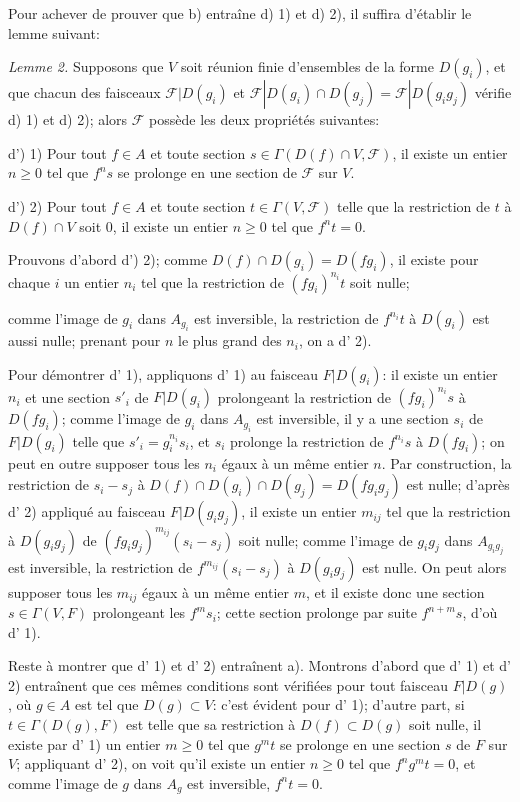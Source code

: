 Pour achever de prouver que b) entraîne d) 1) et d) 2), il suffira d'établir le lemme suivant:

\emph{Lemme 2.} Supposons que $V$ soit réunion finie d'ensembles de la forme $D(g_i)$, et que chacun des faisceaux $\mathcal{F}|D(g_i)$ et $\mathcal{F}|D(g_i) \cap D(g_j) = \mathcal{F}|D(g_i g_j)$ vérifie d) 1) et d) 2); alors $\mathcal{F}$ possède les deux propriétés suivantes:

d') 1) Pour tout $f \in A$ et toute section $s \in \Gamma(D(f) \cap V, \mathcal{F})$, il existe un entier $n \ge 0$ tel que $f^n s$ se prolonge en une section de $\mathcal{F}$ sur $V$.

d') 2) Pour tout $f \in A$ et toute section $t \in \Gamma(V, \mathcal{F})$ telle que la restriction de $t$ à $D(f) \cap V$ soit 0, il existe un entier $n \ge 0$ tel que $f^n t = 0$.

Prouvons d'abord d') 2); comme $D(f) \cap D(g_i) = D(fg_i)$, il existe pour chaque $i$ un entier $n_i$ tel que la restriction de $(fg_i)^{n_i} t$ soit nulle;

\newpage


comme l'image de $g_i$ dans $A_{g_i}$ est inversible, la restriction de $f^{n_i}t$ à $D(g_i)$ est aussi nulle; prenant pour $n$ le plus grand des $n_i$, on a d' 2).

Pour démontrer d' 1), appliquons d' 1) au faisceau $F|D(g_i)$: il existe un entier $n_i$ et une section $s'_i$ de $F|D(g_i)$ prolongeant la restriction de $(fg_i)^{n_i}s$ à $D(fg_i)$; comme l'image de $g_i$ dans $A_{g_i}$ est inversible, il y a une section $s_i$ de $F|D(g_i)$ telle que $s'_i = g_i^{n_i}s_i$, et $s_i$ prolonge la restriction de $f^{n_i}s$ à $D(fg_i)$; on peut en outre supposer tous les $n_i$ égaux à un même entier $n$. Par construction, la restriction de $s_i - s_j$ à $D(f) \cap D(g_i) \cap D(g_j) = D(fg_ig_j)$ est nulle; d'après d' 2) appliqué au faisceau $F|D(g_ig_j)$, il existe un entier $m_{ij}$ tel que la restriction à $D(g_ig_j)$ de $(fg_ig_j)^{m_{ij}}(s_i - s_j)$ soit nulle; comme l'image de $g_ig_j$ dans $A_{g_ig_j}$ est inversible, la restriction de $f^{m_{ij}}(s_i - s_j)$ à $D(g_ig_j)$ est nulle. On peut alors supposer tous les $m_{ij}$ égaux à un même entier $m$, et il existe donc une section $s \in \Gamma(V,F)$ prolongeant les $f^m s_i$; cette section prolonge par suite $f^{n+m}s$, d'où d' 1).

Reste à montrer que d' 1) et d' 2) entraînent a). Montrons d'abord que d' 1) et d' 2) entraînent que ces mêmes conditions sont vérifiées pour tout faisceau $F|D(g)$, où $g \in A$ est tel que $D(g) \subset V$: c'est évident pour d' 1); d'autre part, si $t \in \Gamma(D(g),F)$ est telle que sa restriction à $D(f) \subset D(g)$ soit nulle, il existe par d' 1) un entier $m \ge 0$ tel que $g^m t$ se prolonge en une section $s$ de $F$ sur $V$; appliquant d' 2), on voit qu'il existe un entier $n \ge 0$ tel que $f^n g^m t = 0$, et comme l'image de $g$ dans $A_g$ est inversible, $f^n t = 0$.


